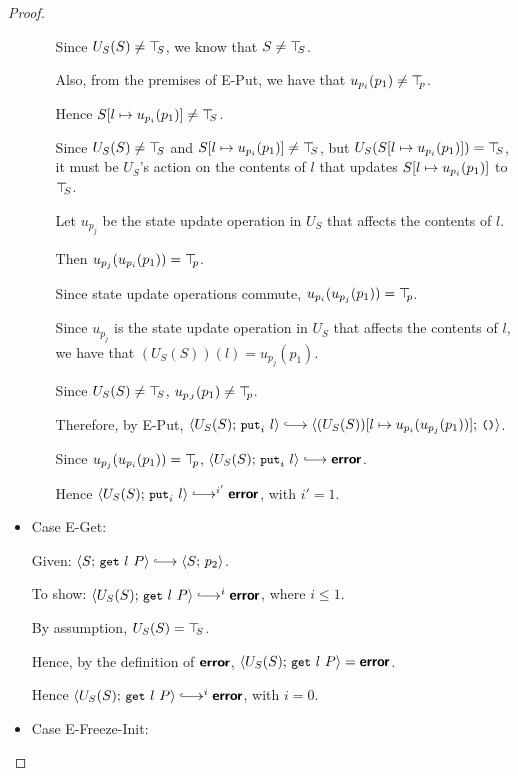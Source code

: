 \begin{proof}
\begin{itemize}
\begin{itemize}
      Since $U_S(S) \neq \top\hspace{-0.85mm}_{S}$, we know that $S \neq \top\hspace{-0.85mm}_{S}$.

      Also, from the premises of {\sc E-Put}, we have that
      $u_{p_i}(p_1) \neq \top\hspace{-0.85mm}_{p}$.

      Hence $S[l \mapsto u_{p_i}(p_1)] \neq \top\hspace{-0.85mm}_{S}$.

      Since $U_S(S) \neq \top\hspace{-0.85mm}_{S}$ and $S[l \mapsto u_{p_i}(p_1)]
      \neq \top\hspace{-0.85mm}_{S}$, but $U_S(S[l \mapsto u_{p_i}(p_1)]) = \top\hspace{-0.85mm}_{S}$,
      it must be $U_S$'s action on the contents of $l$ that updates
      $S[l \mapsto u_{p_i}(p_1)]$ to $\top\hspace{-0.85mm}_{S}$.

      Let $u_{p_j}$ be the state update operation in $U_S$ that
      affects the contents of $l$.

      Then $u_{p_j}(u_{p_i}(p_1)) = \top\hspace{-0.85mm}_{p}$.

      Since state update operations commute, $u_{p_i}(u_{p_j}(p_1))
      = \top\hspace{-0.85mm}_{p}$.

      Since $u_{p_j}$ is the state update operation in $U_S$ that
      affects the contents of $l$, we have that $(U_S(S))(l) =
      u_{p_j}(p_1)$.

      Since $U_S(S) \neq \top\hspace{-0.85mm}_{S}$, $u_{p_J}(p_1) \neq \top\hspace{-0.85mm}_{p}$.

      Therefore, by {\sc E-Put}, $\config{U_S(S)}{\putiexp{l}}
      \parstepsto
      \config{\extSRaw{(U_S(S))}{l}{u_{p_i}(u_{p_j}(p_1))}}{\unit}$.

      Since $u_{p_j}(u_{p_i}(p_1)) = \top\hspace{-0.85mm}_{p}$,
      $\config{U_S(S)}{\putiexp{l}} \parstepsto \error$.

      Hence $\config{U_S(S)}{\putiexp{l}}
      \parstepsto^{i'} \error$, with $i' = 1$.

    \end{itemize}

  \item Case {\sc E-Get}:

    Given: $\config{S}{\getexp{l}{P}} \parstepsto \config{S}{p_2}$.

    To show: $\config{U_S(S)}{\getexp{l}{P}} \parstepsto^i \error$,
    where $i \leq 1$.

    By assumption, $U_S(S) = \top\hspace{-0.85mm}_{S}$.

    Hence, by the definition of $\textbf{\textsf{error}}$,
    $\langle U_S(S);\, \mbox{\small{\texttt{get}}}~l~P \rangle = \textbf{\textsf{error}}$.

    Hence $\config{U_S(S)}{\getexp{l}{P}} \parstepsto^i \error$, with
    $i = 0$.

  \item Case {\sc E-Freeze-Init}:


\end{itemize}
\end{proof}
